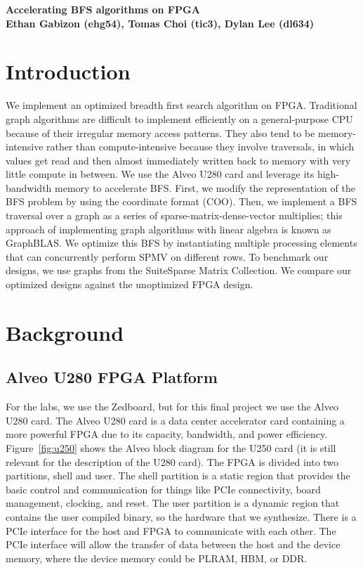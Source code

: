 \documentclass[10pt]{article}
\begin{document}
\begin{center}
    {\LARGE \textbf{Accelerating BFS algorithms on FPGA}} \\[10pt]
    \textbf{Ethan Gabizon (ehg54), Tomas Choi (tic3), Dylan Lee (dl634)}
\end{center}

\section{Introduction}
\noindent We implement an optimized breadth first search algorithm on FPGA. Traditional graph algorithms 
are difficult to implement efficiently on a general-purpose CPU because of their irregular memory 
access patterns. They also tend to be memory-intensive rather than compute-intensive because they 
involve traversals, in which values get read and then almost immediately written back to memory with 
very little compute in between. We use the Alveo U280 card and leverage its high-bandwidth memory to 
accelerate BFS. First, we modify the representation of the BFS problem by using the coordinate format (COO).
Then, we implement a BFS traversal over a graph as a series of sparse-matrix-dense-vector multiplies; this 
approach of implementing graph algorithms with linear algebra is known as GraphBLAS. We optimize this BFS 
by instantiating multiple processing elements that can concurrently perform SPMV on different rows. To 
benchmark our designs, we use graphs from the SuiteSparse Matrix Collection. We compare our optimized designs
against the unoptimized FPGA design.

\section{Background}
\subsection{Alveo U280 FPGA Platform}
\noindent For the labs, we use the Zedboard, but for this final project we use the Alveo U280 card. The Alveo U280 
card is a data center accelerator card containing a more powerful FPGA due to its capacity, bandwidth, and 
power efficiency. Figure~\ref{fig:u250} shows the Alveo block diagram for the U250 card (it is still relevant for 
the description of the U280 card). The FPGA is divided into two partitions, shell and user. The shell partition 
is a static region that provides the basic control and communication for things like PCIe connectivity, board 
management, clocking, and reset. The user partition is a dynamic region that contains the user compiled binary,
so the hardware that we synthesize. There is a PCIe interface for the host and FPGA to communicate with each
other. The PCIe interface will allow the transfer of data between the host and the device memory, where the device 
memory could be PLRAM, HBM, or DDR. \newline
\end{document}
